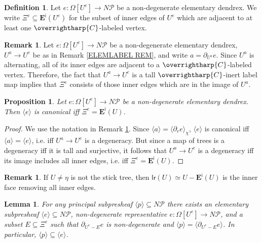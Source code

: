 \documentclass[a4paper,10pt
,draft
]{article}%
\numberwithin{equation}{section}
\numberwithin{figure}{section}
\newtheorem{lemma}[equation]{Lemma}%
\newtheorem{proposition}[equation]{Proposition}%
\theoremstyle{definition} %
\newtheorem{definition}[equation]{Definition}%
\newtheorem{remark}[equation]{Remark}%
\newcommand{\vect}[1]{\text{\overrightharp{\ensuremath{#1}}}}
\newcommand{\1}{\ensuremath{\mathbbm 1}}%
\begin{document}
\begin{definition}\label{XIEDGES DEF}
	Let $e \colon \Omega[U^e] \to N \mathcal{P}$ be a non-degenerate elementary dendrex. 
	We write
	$\Xi^e \subseteq \boldsymbol{E}^{\mathsf{i}}(U^e)$
	for the subset of inner edges of $U^e$ which are adjacent to at least one $\vect{C}$-labeled vertex.
\end{definition}



\begin{remark}\label{XIEREDEF REM}
	Let $e \colon \Omega[U^e] \to N \mathcal{P}$ be a non-degenerate elementary dendrex, 
	$U^a \to U^e$ be as in Remark \ref{ELEMLABEL REM}, 
	and write $a = \partial_{U^a} e$.
	Since $U^a$ is alternating, all of its inner edges are adjacent to a 
	$\vect{C}$-labeled vertex. 
	Therefore, the fact that $U^a \to U^e$ is a tall $\vect{C}$-inert label map
	implies that $\Xi^e$ consists of those inner edges which are in the image of $U^a$.
\end{remark}



\begin{proposition}\label{CANIFFXIE PROP}
	Let $e \colon \Omega[U^e] \to N \mathcal{P}$ be a non-degenerate elementary dendrex.
	Then $\langle e \rangle$
	is canonical iff $\Xi^e = \boldsymbol{E}^{\mathsf{i}}(U)$.
\end{proposition}

\begin{proof}
	We use the notation in Remark \ref{XIEREDEF REM}.
	Since $\langle a\rangle = \langle \partial_r e \rangle_{\chi}$, 
	$\langle e \rangle$
	is canonical 
	iff
	$\langle a\rangle = \langle e \rangle$, i.e.
	iff
	$U^a \to U^e$ is a degeneracy. 
	But since a map of trees is a degeneracy iff it is tall and surjective,
	it follows that $U^a \to U^e$ is a degeneracy
	iff its image includes all inner edges, i.e. iff $\Xi^e = \boldsymbol{E}^{\mathsf{i}}(U)$.
\end{proof}



\begin{remark}\label{WHENLRINN REM}
	If $U\neq \eta$ is not the stick tree,
	then $\mathsf{lr}(U) \simeq U - \boldsymbol{E}^{\mathsf{i}}(U)$
	is the inner face removing all inner edges.
\end{remark}



\begin{lemma}\label{ELEMEXIST LEM}
	For any principal subpresheaf $\langle p \rangle \subseteq N \mathcal{P}$
	there exists an elementary subpresheaf
	$\langle e \rangle \subseteq N \mathcal P$, 
	non-degenerate representative 
	$e \colon \Omega[U^e] \to N \mathcal{P}$,
	and a subset $E \subseteq \Xi^{e}$
	such that
	$\partial_{U^e-E} e$ is non-degenerate and 
	$\langle p \rangle = \langle \partial_{U^e-E} e \rangle$.
	In particular,  
	$\langle p \rangle \subseteq \langle e \rangle$.
\end{lemma}
\end{document}
